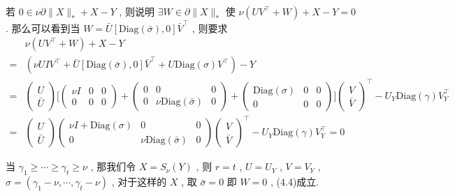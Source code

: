 \documentclass[UTF8]{ctexart}
\newcommand{\norm}[1]{\lVert#1\rVert}
\newcommand{\nunorm}{\norm{X}_*}
\numberwithin{equation}{section}
\begin{document}
			若 $0 \in \nu \partial \nunorm + X -Y$ , 则说明 $\exists W \in \partial \nunorm$ 使 $\nu (UV ^\top + W) + X -Y = 0$ . 那么可以看到当 $W = \bar{U}[\text{Diag}(\bar{\sigma}), 0]\bar{V} ^\top$ , 则要求
				\begin{equation}
					\begin{split}
							&\nu (UV ^\top + W) + X -Y\\
						=	&(\nu U I V ^\top + \bar{U}[\text{Diag}(\bar{\sigma}), 0]\bar{V} ^\top + U \text{Diag}(\sigma) V ^\top) - Y\\
						=	&\begin{pmatrix}
								U \\ \bar{U}
							\end{pmatrix}
							\Bigg [
								\begin{pmatrix}
									\nu I & 0 & 0\\
									0 & 0 & 0
								\end{pmatrix}
								+
								\begin{pmatrix}
									0 & 0 & 0\\
									0 & \nu \text{Diag}(\bar{\sigma}) & 0
								\end{pmatrix}
								+
								\begin{pmatrix}
									\text{Diag}(\sigma) & 0 & 0\\
									0 & 0 & 0
								\end{pmatrix}
								\Bigg ]
							\begin{pmatrix}
								V \\ \bar{V}
							\end{pmatrix} ^\top 
							- U_Y \text{Diag}(\gamma) V_Y ^\top\\
						=	&\begin{pmatrix}
								U \\ \bar{U}
							\end{pmatrix}
							\begin{pmatrix}
								\nu I + \text{Diag}(\sigma) & 0 & 0\\
								0 & \nu \text{Diag}(\bar{\sigma}) & 0
							\end{pmatrix}
							\begin{pmatrix}
								V \\ \bar{V}
							\end{pmatrix} ^\top 
							- U_Y \text{Diag}(\gamma) V_Y ^\top = 0
					\end{split}
				\end{equation}

			当 $\gamma_1 \ge \cdots \ge \gamma_t \ge \nu$ , 那我们令 $X = S_\nu(Y)$ , 则 $r = t$ , $U = U_Y$ , $V = V_Y$ , $\sigma = (\gamma_1 - \nu, \cdots, \gamma_t - \nu)$ , 对于这样的 $X$ , 取 $\bar{\sigma} = 0$ 即 $W = 0$ , (4.4)成立.
\end{document}
